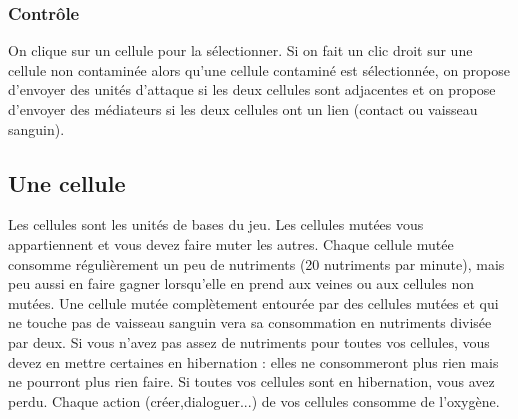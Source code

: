 \documentclass{article}
\begin{document}
\subsubsection{Contrôle}
On clique sur un cellule pour la sélectionner. Si on fait un clic droit sur une cellule non contaminée alors qu'une cellule contaminé est sélectionnée, on propose d'envoyer des unités d'attaque si les deux cellules sont adjacentes et on propose d'envoyer des médiateurs si les deux cellules ont un lien (contact ou vaisseau sanguin).

\subsection{Une cellule}\label{cellule}
Les cellules sont les unités de bases du jeu. Les cellules mutées vous appartiennent et vous devez faire muter les autres. Chaque cellule mutée consomme régulièrement un peu de nutriments (20 nutriments par minute), mais peu aussi en faire gagner lorsqu'elle en prend aux veines ou aux cellules non mutées. Une cellule mutée complètement entourée par des cellules mutées et qui ne touche pas de vaisseau sanguin vera sa consommation en nutriments divisée par deux. Si vous n'avez pas assez de nutriments pour toutes vos cellules, vous devez en mettre certaines en hibernation : elles ne consommeront plus rien mais ne pourront plus rien faire. Si toutes vos cellules sont en hibernation, vous avez perdu. Chaque action (créer,dialoguer...) de vos cellules consomme de l'oxygène.
\end{document}

